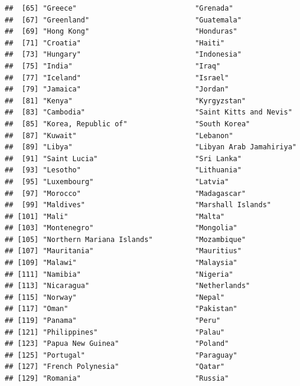 \documentclass[]{article}
\begin{document}
\begin{verbatim}
##  [65] "Greece"                            "Grenada"                          
##  [67] "Greenland"                         "Guatemala"                        
##  [69] "Hong Kong"                         "Honduras"                         
##  [71] "Croatia"                           "Haiti"                            
##  [73] "Hungary"                           "Indonesia"                        
##  [75] "India"                             "Iraq"                             
##  [77] "Iceland"                           "Israel"                           
##  [79] "Jamaica"                           "Jordan"                           
##  [81] "Kenya"                             "Kyrgyzstan"                       
##  [83] "Cambodia"                          "Saint Kitts and Nevis"            
##  [85] "Korea, Republic of"                "South Korea"                      
##  [87] "Kuwait"                            "Lebanon"                          
##  [89] "Libya"                             "Libyan Arab Jamahiriya"           
##  [91] "Saint Lucia"                       "Sri Lanka"                        
##  [93] "Lesotho"                           "Lithuania"                        
##  [95] "Luxembourg"                        "Latvia"                           
##  [97] "Morocco"                           "Madagascar"                       
##  [99] "Maldives"                          "Marshall Islands"                 
## [101] "Mali"                              "Malta"                            
## [103] "Montenegro"                        "Mongolia"                         
## [105] "Northern Mariana Islands"          "Mozambique"                       
## [107] "Mauritania"                        "Mauritius"                        
## [109] "Malawi"                            "Malaysia"                         
## [111] "Namibia"                           "Nigeria"                          
## [113] "Nicaragua"                         "Netherlands"                      
## [115] "Norway"                            "Nepal"                            
## [117] "Oman"                              "Pakistan"                         
## [119] "Panama"                            "Peru"                             
## [121] "Philippines"                       "Palau"                            
## [123] "Papua New Guinea"                  "Poland"                           
## [125] "Portugal"                          "Paraguay"                         
## [127] "French Polynesia"                  "Qatar"                            
## [129] "Romania"                           "Russia"                           

\end{verbatim}
\end{document}
